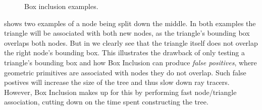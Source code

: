 \begin{figure}
  \centering {}
  \hspace{5mm}
  \caption{Box inclusion examples.}
  \label{fig:boxInclusion}
\end{figure}


 shows two examples of a node being split down the
middle. In both examples the triangle will be associated with both new nodes, as
the triangle's bounding box overlaps both nodes. But in
 we clearly see that the triangle itself does not
overlap the right node's bounding box. This illustrates the drawback of only
testing a triangle's bounding box and how Box Inclusion can produce
\textit{false positives}, where geometric primitives are associated with nodes
they do not overlap. Such false postives will increase the size of the tree and
thus slow down ray tracers. However, Box Inclusion makes up for this by
performing fast node/triangle association, cutting down on the time spent
constructing the tree.





